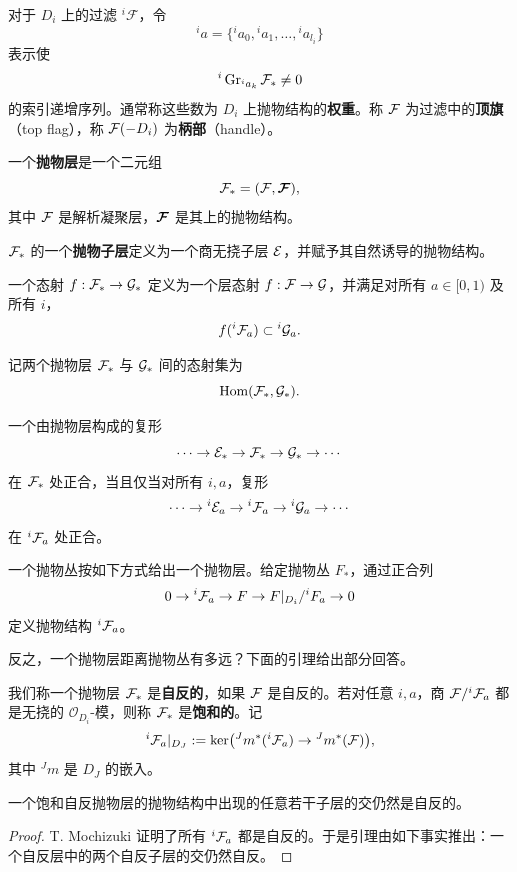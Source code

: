 对于 \(D_i\) 上的过滤 \({}^i\mathcal F\)，令
\[
{}^ia=\{{}^ia_0,{}^ia_1,\dots,{}^ia_{l_i}\}
\]
表示使
\[
{}^i\operatorname{Gr}_{{}^ia_k}\mathcal{F}_{*}\neq 0
\]
的索引递增序列。通常称这些数为 \(D_i\) 上抛物结构的\textbf{权重}。称 \(\mathcal{F}\) 为过滤中的\textbf{顶旗}（top flag），称 \(\mathcal{F}(-D_i)\) 为\textbf{柄部}（handle）。

\begin{definition}
一个\textbf{抛物层}是一个二元组
\[
\mathcal{F}_{*}=(\mathcal{F},\boldsymbol{\mathcal{F}}),
\]
其中 \(\mathcal{F}\) 是解析凝聚层，\(\boldsymbol{\mathcal{F}}\) 是其上的抛物结构。
\end{definition}

\begin{definition}
\(\mathcal{F}_{*}\) 的一个\textbf{抛物子层}定义为一个商无挠子层 \(\mathcal{E}\)，并赋予其自然诱导的抛物结构。
\end{definition}

\begin{definition}
一个态射 \(f:\mathcal{F}_{*}\to \mathcal{G}_{*}\) 定义为一个层态射 \(f:\mathcal{F}\to \mathcal{G}\)，并满足对所有 \(a\in[0,1)\) 及所有 \(i\)，
\[
f({}^i\mathcal{F}_a)\subset {}^i\mathcal{G}_a.
\]
\end{definition}

记两个抛物层 \(\mathcal{F}_{*}\) 与 \(\mathcal{G}_{*}\) 间的态射集为
\[
\operatorname{Hom}(\mathcal{F}_{*},\mathcal{G}_{*}).
\]

\begin{definition}
一个由抛物层构成的复形
\[
\cdots\to \mathcal{E}_{*}\to \mathcal{F}_{*}\to \mathcal{G}_{*}\to\cdots
\]
在 \(\mathcal{F}_{*}\) 处正合，当且仅当对所有 \(i,a\)，复形
\[
\cdots\to {}^i\mathcal{E}_a\to {}^i\mathcal{F}_a\to {}^i\mathcal{G}_a\to\cdots
\]
在 \({}^i\mathcal{F}_a\) 处正合。
\end{definition}

一个抛物丛按如下方式给出一个抛物层。给定抛物丛 \(F_*\)，通过正合列
\[
0\to {}^i\mathcal{F}_a\to F\to F|_{D_i}/{}^iF_a\to 0
\]
定义抛物结构 \({}^i\mathcal{F}_a\)。

反之，一个抛物层距离抛物丛有多远？下面的引理给出部分回答。

我们称一个抛物层 \(\mathcal{F}_{*}\) 是\textbf{自反的}，如果 \(\mathcal{F}\) 是自反的。若对任意 \(i,a\)，商 \(\mathcal{F}/{}^i\mathcal{F}_a\) 都是无挠的 \(\mathcal O_{D_i}\)-模，则称 \(\mathcal{F}_{*}\) 是\textbf{饱和的}。记
\[
{}^i\mathcal{F}_a|_{D_J}:=\ker\bigl({}^Jm^{*}({}^i\mathcal{F}_a)\to {}^Jm^{*}(\mathcal{F})\bigr),
\]
其中 \({}^Jm\) 是 \(D_J\) 的嵌入。

\begin{lemma}
一个饱和自反抛物层的抛物结构中出现的任意若干子层的交仍然是自反的。
\end{lemma}

\begin{proof}
T. Mochizuki \cite[Proposition 3.1.2]{Mo3} 证明了所有 \({}^i\mathcal{F}_a\) 都是自反的。于是引理由如下事实推出：一个自反层中的两个自反子层的交仍然自反。
\end{proof}

